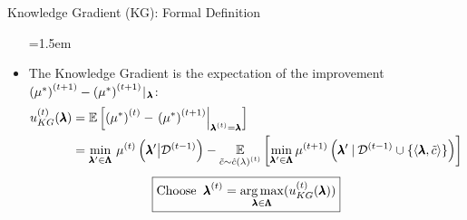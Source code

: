 \begin{frame}[c]{Knowledge Gradient (KG): Formal Definition}
\begin{itemize}\belowdisplayskip=1.5em
    
    \item The Knowledge Gradient is the \alert{expectation of the improvement $\iter[\bocount+1]{\left(\mean^*\right)} - \iter[\bocount+1]{\left(\mean^*\right)} \!\given_{\!\conf}$}:
    \[
    \begin{split}
        \iter{\acq}_{KG}(\conf) 
        &= \E\left[ \iter{\left(\mean^*\right)} - \left. \iter[\bocount+1]{\left(\mean^*\right)} \right|_{\bonextsample=\conf} \right]\\
        &=\min_{\conf'\in\pcs} \, \iter{\mean} \left(\conf' \big| \iter[\bocount-1]{\dataset} \right)
        - \E_{\tilde{\cost} \sim \iter[\bocount]{\surro(\lambda)}}
        \left[\min_{\conf'\in\pcs}\iter[\bocount+1]{\mean}\left(\conf'\given{\iter[\bocount-1]{\dataset} \cup \left\{\left\langle\conf, \tilde{\cost} \right\rangle \right\}}\right)\right]
    \end{split}
    \]
\fhpause
\bigskip
\[
    \boxed{\text{Choose}\;\;\bonextsample = \argmax_{\conf\in\pcs}(\iter{\acq}_{KG}(\conf))}
    \]
\end{itemize}
\end{frame}



